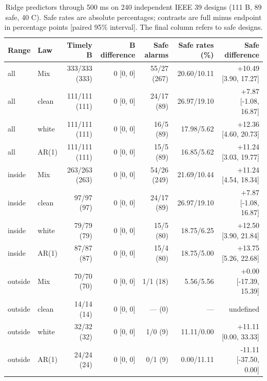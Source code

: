 \documentclass[10pt]{article}
\begin{document}
\begin{table}[htbp]\centering\small
\caption{Ridge predictors through 500 ms on 240 independent IEEE 39 designs (111 B, 89 safe, 40 C). Safe rates are absolute percentages; contrasts are full minus endpoint in percentage points [paired 95\% interval]. The final column refers to safe designs.}\label{tab:r4ridge}
\setlength{\tabcolsep}{3pt}
\begin{tabular}{llrrrrr}\toprule
Range & Law & Timely B & B difference & Safe alarms & Safe rates (\%) & Safe difference\\\midrule
all & Mix & 333/333 (333) & 0 [0, 0] & 55/27 (267) & 20.60/10.11 & +10.49 [3.90, 17.27] \\
all & clean & 111/111 (111) & 0 [0, 0] & 24/17 (89) & 26.97/19.10 & +7.87 [-1.08, 16.87] \\
all & white & 111/111 (111) & 0 [0, 0] & 16/5 (89) & 17.98/5.62 & +12.36 [4.60, 20.73] \\
all & AR(1) & 111/111 (111) & 0 [0, 0] & 15/5 (89) & 16.85/5.62 & +11.24 [3.03, 19.77] \\
inside & Mix & 263/263 (263) & 0 [0, 0] & 54/26 (249) & 21.69/10.44 & +11.24 [4.54, 18.34] \\
inside & clean & 97/97 (97) & 0 [0, 0] & 24/17 (89) & 26.97/19.10 & +7.87 [-1.08, 16.87] \\
inside & white & 79/79 (79) & 0 [0, 0] & 15/5 (80) & 18.75/6.25 & +12.50 [3.90, 21.84] \\
inside & AR(1) & 87/87 (87) & 0 [0, 0] & 15/4 (80) & 18.75/5.00 & +13.75 [5.26, 22.68] \\
outside & Mix & 70/70 (70) & 0 [0, 0] & 1/1 (18) & 5.56/5.56 & +0.00 [-17.39, 15.39] \\
outside & clean & 14/14 (14) & 0 [0, 0] & --- (0) & --- & undefined \\
outside & white & 32/32 (32) & 0 [0, 0] & 1/0 (9) & 11.11/0.00 & +11.11 [0.00, 33.33] \\
outside & AR(1) & 24/24 (24) & 0 [0, 0] & 0/1 (9) & 0.00/11.11 & -11.11 [-37.50, 0.00] \\
\bottomrule\end{tabular}\end{table}

\clearpage
\end{document}
